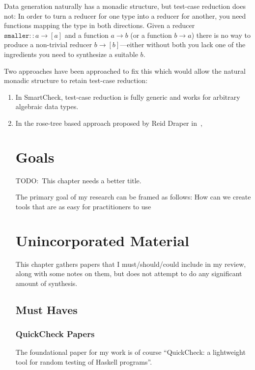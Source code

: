 Data generation naturally has a monadic structure,
but test-case reduction does not:
In order to turn a reducer for one type into a reducer for another,
you need functions mapping the type in both directions.
Given a reducer \(\texttt{smaller} :: a \to [a]\) and a function \(a \to b\) (or a function \(b \to a\)) there is no way to produce a non-trivial reducer \(b \to [b]\)---either
without both you lack one of the ingredients you need to synthesize a suitable \(b\).

Two approaches have been approached to fix this which would allow the natural monadic structure to retain test-case reduction:

\begin{enumerate}
\item In SmartCheck\cite{DBLP:conf/haskell/Pike14},
test-case reduction is fully generic and works for arbitrary algebraic data types.
\item In the rose-tree based approach proposed by Reid Draper in~\cite{FreeShrinking},

\chapter{Goals}

TODO:\ This chapter needs a better title.

The primary goal of my research can be framed as follows:
How can we create tools that are as easy for practitioners to use 

\chapter{Unincorporated Material}

This chapter gathers papers that I must/should/could include in my review,
along with some notes on them,
but does not attempt to do any significant amount of synthesis.

\section{Must Haves}

\subsection{QuickCheck Papers}

The foundational paper for my work is of course ``QuickCheck: a lightweight tool for random testing of Haskell programs''\cite{DBLP:conf/icfp/ClaessenH00}.


\end{enumerate}
